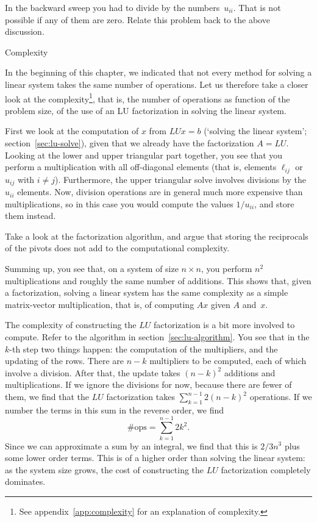\begin{exercise}
  In the backward sweep you had to divide by the
  numbers~$u_{ii}$. That is not possible if any of them are zero.
  Relate this problem back to the above discussion. 
\end{exercise}

 {Complexity}

In the beginning of this chapter, we indicated that not every method
for solving a linear system takes the same number of operations. Let
us therefore take a closer look at the complexity\footnote{See
  appendix~\ref{app:complexity} for an explanation of complexity.},
that is, the number of operations as function of the problem size, of
the use of an LU factorization in solving the linear system.

First we look at the computation of $x$ from $LUx=b$
(`solving the linear system'; section~\ref{sec:lu-solve}), given that
we already have the factorization $A=LU$.
Looking at the lower and upper
triangular part together, you see that you perform a multiplication
with all off-diagonal elements (that is, elements $\ell_{ij}$
or~$u_{ij}$ with $i\not=j$). Furthermore, the upper triangular solve
involves divisions by the $u_{ii}$ elements. Now, division operations
are in general much more expensive than multiplications, so in this
case you would compute the values $1/u_{ii}$, and store them instead.

\begin{exercise}
  Take a look at the factorization algorithm, and argue that storing
  the reciprocals of the pivots does not add to the computational
  complexity.
\end{exercise}

Summing up, you see that, on a system of size $n\times n$, you perform
$n^2$ multiplications and roughly the same number of additions.
This shows that, given a factorization, solving a linear system
has the same complexity as a simple matrix-vector multiplication,
that is, of computing $Ax$ given $A$ and~$x$.

The complexity of constructing the $LU$ factorization is a bit more
involved to compute. Refer to the algorithm in section~\ref{sec:lu-algorithm}.
You see that in the $k$-th step two things happen: the computation of
the multipliers, and the updating of the rows.
%
There are $n-k$ multipliers to be computed, each of which involve a
division. After that, the update takes $(n-k)^2$ additions and
multiplications. If we ignore the divisions for now, because there are
fewer of them, we find that the $LU$ factorization takes
$\sum_{k=1}^{n-1} 2(n-k)^2$
operations. If we number the terms in this sum in the reverse order,
we find \[ \#\mathrm{ops}=\sum_{k=1}^{n-1} 2k^2. \]
Since we can approximate a sum by an integral,
we find that this is $2/3n^3$ plus some lower
order terms. This is of a higher order than solving the linear system:
as the system size grows, the cost of constructing the $LU$
factorization completely dominates.

